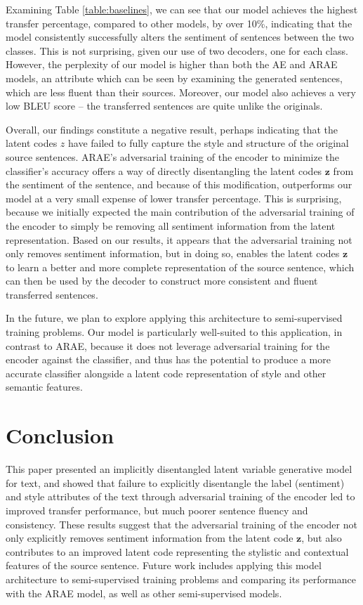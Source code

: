 \documentclass{article}
\newcommand{\vect}[1]{\boldsymbol{#1}}
\begin{document}
Examining Table \ref{table:baselines}, we can see that our model achieves the highest transfer percentage, compared to other models, by over 10\%, indicating that the model consistently successfully alters the sentiment of sentences between the two classes. This is not surprising, given our use of two decoders, one for each class. However, the perplexity of our model is higher than both the AE and ARAE models, an attribute which can be seen by examining the generated sentences, which are less fluent than their sources. Moreover, our model also achieves a very low BLEU score -- the transferred sentences are quite unlike the originals. 

Overall, our findings constitute a negative result, perhaps indicating that the latent codes $z$ have failed to fully capture the style and structure of the original source sentences. ARAE's adversarial training of the encoder to minimize the classifier's accuracy offers a way of directly disentangling the latent codes $\vect{z}$ from the sentiment of the sentence, and because of this modification, outperforms our model at a very small expense of lower transfer percentage. This is surprising, because we initially expected the main contribution of the adversarial training of the encoder to simply be removing all sentiment information from the latent representation. Based on our results, it appears that the adversarial training not only removes sentiment information, but in doing so, enables the latent codes $\vect{z}$ to learn a better and more complete representation of the source sentence, which can then be used by the decoder to construct more consistent and fluent transferred sentences.

In the future, we plan to explore applying this architecture to semi-supervised training problems. Our model is particularly well-suited to this application, in contrast to ARAE, because it does not leverage adversarial training for the encoder against the classifier, and thus has the potential to produce a more accurate classifier alongside a latent code representation of style and other semantic features.

\section{Conclusion}

This paper presented an implicitly disentangled latent variable generative model for text, and showed that failure to explicitly disentangle the label (sentiment) and style attributes of the text through adversarial training of the encoder led to improved transfer performance, but much poorer sentence fluency and consistency. These results suggest that the adversarial training of the encoder not only explicitly removes sentiment information from the latent code $\vect{z}$, but also contributes to an improved latent code representing the stylistic and contextual features of the source sentence. Future work includes applying this model architecture to semi-supervised training problems and comparing its performance with the ARAE model, as well as other semi-supervised models.
\end{document}
